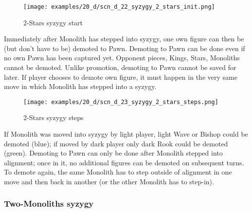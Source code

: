\clearpage %

\vspace*{-2.3\baselineskip}
\noindent
\begin{figure}[!h]
\texttt{[image: examples/20\_d/scn\_d\_22\_syzygy\_2\_stars\_init.png]}
\vspace*{-1.3\baselineskip}
\caption{2-Stars syzygy start}
\label{fig:scn_d_22_syzygy_2_stars_init}
\end{figure}

\vspace*{-0.4\baselineskip}
Immediately after Monolith has stepped into syzygy, one own figure can then be (but
don't have to be) demoted to Pawn. Demoting to Pawn can be done even if no own Pawn
has been captured yet. Opponent pieces, Kings, Stars, Monoliths cannot be demoted.
Unlike promotion, demoting to Pawn cannot be saved for later. If player chooses to
demote own figure, it must happen in the very same move in which Monolith has
stepped into a syzygy.

\clearpage %

\vspace*{-2.3\baselineskip}
\noindent
\begin{figure}[!h]
\texttt{[image: examples/20\_d/scn\_d\_23\_syzygy\_2\_stars\_steps.png]}
\vspace*{-1.3\baselineskip}
\caption{2-Stars syzygy steps}
\label{fig:scn_d_23_syzygy_2_stars_steps}
\end{figure}

\vspace*{-0.4\baselineskip}
If Monolith was moved into syzygy by light player, light Wave or Bishop could be
demoted (blue); if moved by dark player only dark Rook could be demoted (green).
Demoting to Pawn can only be done after Monolith stepped into alignment; once in
it, no additional figures can be demoted on subsequent turns. To demote again,
the same Monolith has to step outside of alignment in one move and then back in
another (or the other Monolith has to step-in).

\clearpage %

\subsubsection*{Two-Monoliths syzygy}
\label{sec:Discovery/Monolith/Syzygy/Two-Monoliths syzygy}

